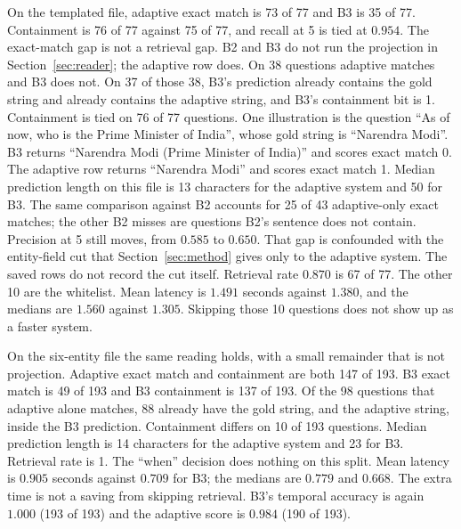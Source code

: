 \documentclass[11pt,letterpaper]{article}
\begin{document}
On the templated file, adaptive exact match is 73 of 77 and B3 is 35 of 77.
Containment is 76 of 77 against 75 of 77, and recall at 5 is tied at $0.954$.
The exact-match gap is not a retrieval gap.
B2 and B3 do not run the projection in Section~\ref{sec:reader}; the adaptive row does.
On 38 questions adaptive matches and B3 does not.
On 37 of those 38, B3's prediction already contains the gold string and already contains the adaptive string, and B3's containment bit is 1.
Containment is tied on 76 of 77 questions.
One illustration is the question ``As of now, who is the Prime Minister of India'', whose gold string is ``Narendra Modi''.
B3 returns ``Narendra Modi (Prime Minister of India)'' and scores exact match 0.
The adaptive row returns ``Narendra Modi'' and scores exact match 1.
Median prediction length on this file is 13 characters for the adaptive system and 50 for B3.
The same comparison against B2 accounts for 25 of 43 adaptive-only exact matches; the other B2 misses are questions B2's sentence does not contain.
Precision at 5 still moves, from $0.585$ to $0.650$.
That gap is confounded with the entity-field cut that Section~\ref{sec:method} gives only to the adaptive system.
The saved rows do not record the cut itself.
Retrieval rate $0.870$ is 67 of 77.
The other 10 are the whitelist.
Mean latency is $1.491$ seconds against $1.380$, and the medians are $1.560$ against $1.305$.
Skipping those 10 questions does not show up as a faster system.

On the six-entity file the same reading holds, with a small remainder that is not projection.
Adaptive exact match and containment are both 147 of 193.
B3 exact match is 49 of 193 and B3 containment is 137 of 193.
Of the 98 questions that adaptive alone matches, 88 already have the gold string, and the adaptive string, inside the B3 prediction.
Containment differs on 10 of 193 questions.
Median prediction length is 14 characters for the adaptive system and 23 for B3.
Retrieval rate is 1.
The ``when'' decision does nothing on this split.
Mean latency is $0.905$ seconds against $0.709$ for B3; the medians are $0.779$ and $0.668$.
The extra time is not a saving from skipping retrieval.
B3's temporal accuracy is again $1.000$ (193 of 193) and the adaptive score is $0.984$ (190 of 193).
\end{document}
